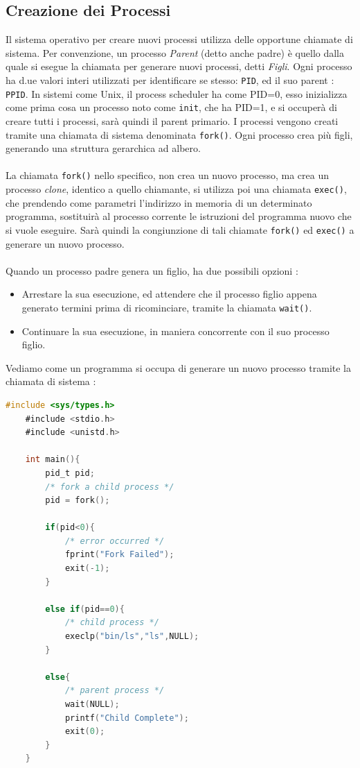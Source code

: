 \documentclass[12pt, letterpaper]{article}
\newcommand{\code}[1]{\colorbox{light-gray}{\texttt{#1}}}
\begin{document}
\subsection{Creazione dei Processi}
Il sistema operativo per creare nuovi processi utilizza delle opportune chiamate di sistema. Per convenzione, 
un processo \textit{Parent} (detto anche padre) è quello dalla quale si esegue la chiamata per generare nuovi processi, detti 
\textit{Figli}. Ogni processo ha d.ue valori interi utilizzati per identificare se stesso: \code{PID}, ed 
il suo parent : \code{PPID}. In sistemi come Unix, il process scheduler ha come PID=0, esso inizializza 
come prima cosa un processo noto come \code{init}, che ha PID=1, e si occuperà di creare tutti i processi, sarà 
quindi il parent primario. I processi vengono creati tramite una chiamata di sistema denominata \code{fork()}.
Ogni processo crea più figli, generando una struttura gerarchica ad albero.\\
\hphantom{}\\ La chiamata \code{fork()} nello 
specifico, non crea un nuovo processo, ma crea un processo \textit{clone}, identico a quello chiamante, si utilizza 
poi una chiamata \code{exec()}, che prendendo come parametri l'indirizzo in memoria di un determinato programma, 
sostituirà al processo corrente le istruzioni del programma nuovo che si vuole eseguire. Sarà quindi la congiunzione 
di tali chiamate \code{fork()} ed \code{exec()} a generare un nuovo processo.
\\\hphantom{}\\ 
Quando un processo padre genera un figlio, ha due possibili opzioni :\begin{itemize}
    \item Arrestare la sua esecuzione, ed attendere che il processo figlio appena generato termini prima di ricominciare,
    tramite la chiamata \code{wait()}.
    \item Continuare la sua esecuzione, in maniera concorrente con il suo processo figlio.
\end{itemize}
Vediamo come un programma si occupa di generare un nuovo processo tramite la chiamata di sistema :\newpage
\begin{lstlisting}[language=C]
    #include <sys/types.h>
    #include <stdio.h>
    #include <unistd.h>
    
    int main(){
        pid_t pid;
        /* fork a child process */
        pid = fork();

        if(pid<0){
            /* error occurred */
            fprint("Fork Failed");
            exit(-1);
        }

        else if(pid==0){
            /* child process */
            execlp("bin/ls","ls",NULL);
        }

        else{
            /* parent process */
            wait(NULL);
            printf("Child Complete");
            exit(0);
        }
    }
\end{lstlisting}
\end{document}
